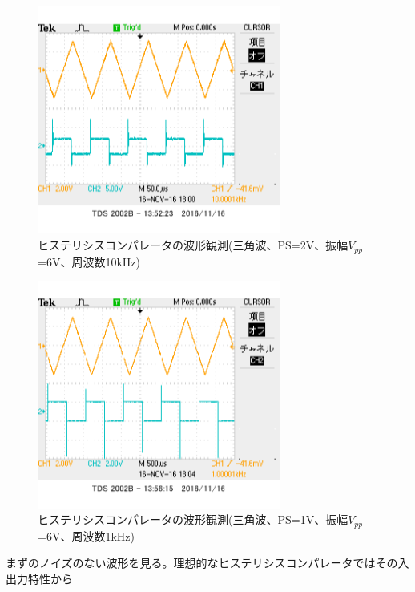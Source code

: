 \documentclass[11pt,a4j]{jsarticle}
\begin{document}
 \begin{figure}[htbp]
  \centering
  \includegraphics[width=8cm,clip]{1_2_histeri_Vth2f10V6sankaku_ViVo.png}
  \caption{ヒステリシスコンパレータの波形観測(三角波、PS=2V、振幅$V_{pp}$=6V、周波数10kHz)}
  \label{fig:histeri_2-10}
 \end{figure}
 
 \begin{figure}[htbp]
  \centering
  \includegraphics[width=8cm,clip]{1_2_histeri_Vth1f1V6sankaku_ViVo.png}
  \caption{ヒステリシスコンパレータの波形観測(三角波、PS=1V、振幅$V_{pp}$=6V、周波数1kHz)}
  \label{fig:histeri_1-1}
 \end{figure}
 	
 	まずのノイズのない波形を見る。理想的なヒステリシスコンパレータではその入出力特性から
 	
\end{document}
